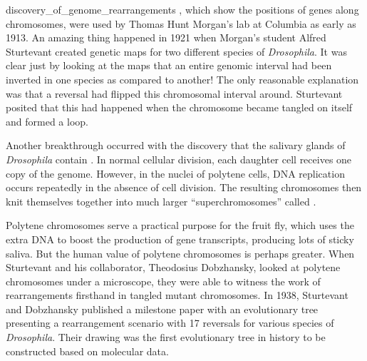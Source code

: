 \begin{detour}{discovery_of_genome_rearrangements}
, which show the positions of genes along chromosomes, were used by Thomas Hunt Morgan's lab at Columbia as early as 1913.  An amazing thing happened in 1921 when Morgan's student Alfred Sturtevant created genetic maps for two different species of \textit{Drosophila}. It was clear just by looking at the maps that an entire genomic interval had been inverted in one species as compared to another! The only reasonable explanation was that a reversal had flipped this chromosomal interval around. Sturtevant posited that this had happened when the chromosome became tangled on itself and formed a loop.

Another breakthrough occurred with the discovery that the salivary glands of \textit{Drosophila} contain .  In normal cellular division, each daughter cell receives one copy of the genome.  However, in the nuclei of polytene cells, DNA replication occurs repeatedly in the absence of cell division.  The resulting chromosomes then knit themselves together into much larger ``superchromosomes'' called .

Polytene chromosomes serve a practical purpose for the fruit fly, which uses the extra DNA to boost the production of gene transcripts, producing lots of sticky saliva. But the human value of polytene chromosomes is perhaps greater.  When Sturtevant and his collaborator, Theodosius Dobzhansky, looked at polytene chromosomes under a microscope, they were able to witness the work of rearrangements  firsthand in tangled mutant chromosomes. In 1938, Sturtevant and Dobzhansky published a milestone paper with an evolutionary tree presenting a rearrangement scenario with 17 reversals for various species of \textit{Drosophila}. Their drawing was the first evolutionary tree in history to be constructed based on molecular data.

\end{detour}

